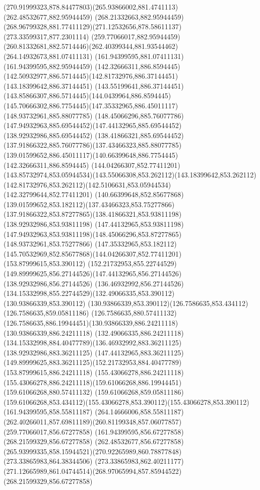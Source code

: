{{	\curveto(270.91999323,878.84477803)(265.93866002,881.4741113)(262.48532677,882.95944459)
	\lineto(268.21332663,882.95944459)
	\curveto(268.96799328,881.77411129)(271.12532656,878.58611137)(273.33599317,877.2301114)
	\moveto(259.77066017,882.95944459)
	\curveto(260.81332681,882.5714446)(262.40399344,881.93544462)(264.14932673,881.07411131)
	\lineto(161.94399595,881.07411131)
	\lineto(161.94399595,882.95944459)
	\closepath
	\moveto(142.32666311,886.8594445)
	\curveto(142.50932977,886.5714445)(142.81732976,886.37144451)(143.18399642,886.37144451)
	\curveto(143.55199641,886.37144451)(143.85866307,886.5714445)(144.0439964,886.8594445)
	\curveto(145.70666302,886.7754445)(147.35332965,886.45011117)(148.93732961,885.88077785)
	\curveto(148.45066296,885.76077786)(147.94932963,885.69544452)(147.44132965,885.69544452)
	\lineto(138.92932986,885.69544452)
	\curveto(138.41866321,885.69544452)(137.91866322,885.76077786)(137.43466323,885.88077785)
	\curveto(139.01599652,886.45011117)(140.66399648,886.7754445)(142.32666311,886.8594445)
	\moveto(144.04266307,852.77411201)
	\curveto(143.85732974,853.05944534)(143.55066308,853.262112)(143.18399642,853.262112)
	\curveto(142.81732976,853.262112)(142.5106631,853.05944534)(142.32799644,852.77411201)
	\curveto(140.66399648,852.85677868)(139.01599652,853.182112)(137.43466323,853.75277866)
	\curveto(137.91866322,853.87277865)(138.41866321,853.93811198)(138.92932986,853.93811198)
	\lineto(147.44132965,853.93811198)
	\curveto(147.94932963,853.93811198)(148.45066296,853.87277865)(148.93732961,853.75277866)
	\curveto(147.35332965,853.182112)(145.70532969,852.85677868)(144.04266307,852.77411201)
	\moveto(153.87999615,853.390112)
	\curveto(152.21732953,855.22744529)(149.89999625,856.27144526)(147.44132965,856.27144526)
	\lineto(138.92932986,856.27144526)
	\curveto(136.46932992,856.27144526)(134.15332998,855.22744529)(132.49066335,853.390112)
	\lineto(130.93866339,853.390112)
	\curveto(130.93866339,853.390112)(126.7586635,853.434112)(126.7586635,859.05811186)
	\lineto(126.7586635,880.57411132)
	\curveto(126.7586635,886.19944451)(130.93866339,886.24211118)(130.93866339,886.24211118)
	\lineto(132.49066335,886.24211118)
	\curveto(134.15332998,884.40477789)(136.46932992,883.36211125)(138.92932986,883.36211125)
	\lineto(147.44132965,883.36211125)
	\curveto(149.89999625,883.36211125)(152.21732953,884.40477789)(153.87999615,886.24211118)
	\lineto(155.43066278,886.24211118)
	\curveto(155.43066278,886.24211118)(159.61066268,886.19944451)(159.61066268,880.57411132)
	\lineto(159.61066268,859.05811186)
	\curveto(159.61066268,853.434112)(155.43066278,853.390112)(155.43066278,853.390112)
	\closepath
	\moveto(161.94399595,858.55811187)
	\lineto(264.14666006,858.55811187)
	\curveto(262.40266011,857.69811189)(260.81199348,857.06077857)(259.77066017,856.67277858)
	\lineto(161.94399595,856.67277858)
	\closepath
	\moveto(268.21599329,856.67277858)
	\lineto(262.48532677,856.67277858)
	\curveto(265.93999335,858.15944521)(270.92265989,860.78877848)(273.33865983,864.38344506)
	\lineto(273.33865983,862.40211177)
	\curveto(271.12665989,861.04744514)(268.97065994,857.85944522)(268.21599329,856.67277858)
}
}

